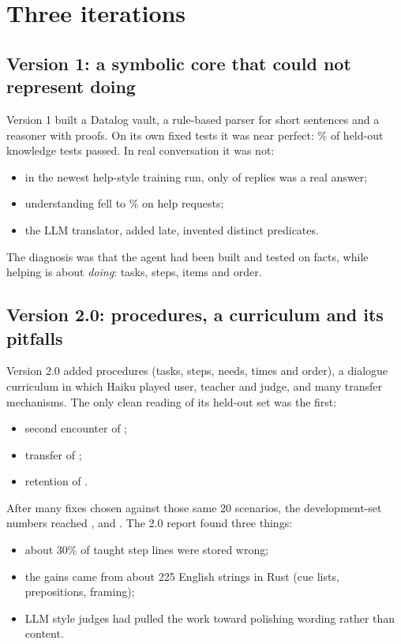 \section{Three iterations}

\subsection{Version 1: a symbolic core that could not represent doing}
Version 1 built a Datalog vault, a rule-based parser for short sentences and a reasoner with proofs. On its own fixed tests it was near perfect: \vOneKnowledgeHeldout\% of held-out knowledge tests passed. In real conversation it was not:
\begin{itemize}
  \item in the newest help-style training run, only \vOneRealAnswers{} of \vOneRealAnswersOf{} replies was a real answer;
  \item understanding fell to \vOneHelpUnderstood\% on help requests;
  \item the LLM translator, added late, invented \vOnePredicates{} distinct predicates.
\end{itemize}
The diagnosis was that the agent had been built and tested on facts, while helping is about \emph{doing}: tasks, steps, items and order.

\subsection{Version 2.0: procedures, a curriculum and its pitfalls}
Version 2.0 added procedures (tasks, steps, needs, times and order), a dialogue curriculum in which Haiku played user, teacher and judge, and many transfer mechanisms. The only clean reading of its held-out set was the first:
\begin{itemize}
  \item second encounter \vTwoCleanSecond{} of \vTwoCleanSecondOf;
  \item transfer \vTwoCleanTransfer{} of \vTwoCleanTransferOf;
  \item retention \vTwoCleanRetention{} of \vTwoCleanRetentionOf.
\end{itemize}
After many fixes chosen against those same 20 scenarios, the development-set numbers reached \vTwoDevSecond{}, \vTwoDevTransfer{} and \vTwoDevRetention{}. The 2.0 report found three things:
\begin{itemize}
  \item about 30\% of taught step lines were stored wrong;
  \item the gains came from about 225 English strings in Rust (cue lists, prepositions, framing);
  \item LLM style judges had pulled the work toward polishing wording rather than content.
\end{itemize}

